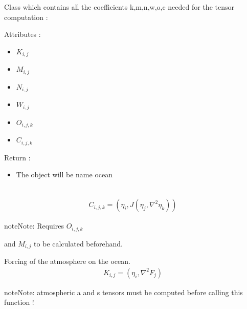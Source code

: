 \documentclass[letterpaper,10pt,english]{sphinxmanual}
\begin{document}

\begin{fulllineitems}
\label{rstfiles/inprod_analytic:inprod_analytic.ocean_tensors}
Class which contains all the coefficients k,m,n,w,o,c     needed for the tensor computation :

Attributes :
\begin{itemize}
\item {} 
\(K_{i,j}\)

\item {} 
\(M_{i,j}\)

\item {} 
\(N_{i,j}\)

\item {} 
\(W_{i,j}\)

\item {} 
\(O_{i,j,k}\)

\item {} 
\(C_{i,j,k}\)

\end{itemize}

Return :
\begin{itemize}
\item {} 
The object will be name ocean

\end{itemize}

\begin{fulllineitems}
\label{rstfiles/inprod_analytic:inprod_analytic.ocean_tensors.calculate_C_oc}~\begin{equation*}
\begin{split}C_{i,j,k} = (\eta_i, J(\eta_j,\nabla^2 \eta_k))\end{split}
\end{equation*}
\begin{notice}{note}{Note:}
Requires \(O_{i,j,k}\) 
\end{notice}

and \(M_{i,j}\) to be calculated beforehand.

\end{fulllineitems}


\begin{fulllineitems}
\label{rstfiles/inprod_analytic:inprod_analytic.ocean_tensors.calculate_K}
Forcing of the atmosphere on the ocean.
\begin{equation*}
\begin{split}K_{i,j} = (\eta_i, \nabla^2 F_j)\end{split}
\end{equation*}
\begin{notice}{note}{Note:}
atmospheric a and s tensors must be computed before calling
this function !
\end{notice}


\end{fulllineitems}
\end{fulllineitems}
\end{document}
